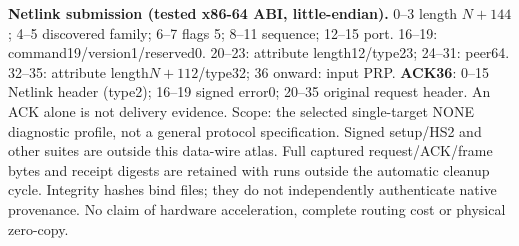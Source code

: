 \documentclass[10pt,a4paper]{article}
\begin{document}
\textbf{Netlink submission (tested x86-64 ABI, little-endian).} 0--3 length $N+144$; 4--5 discovered family; 6--7 flags 5; 8--11 sequence; 12--15 port. 16--19: command19/version1/reserved0. 20--23: attribute length12/type23; 24--31: peer64. 32--35: attribute length$N+112$/type32; 36 onward: input PRP. \textbf{ACK36}: 0--15 Netlink header (type2); 16--19 signed error0; 20--35 original request header. An ACK alone is not delivery evidence.
\vfill
\footnotesize\color{muted}Scope: the selected single-target NONE diagnostic profile, not a general protocol specification. Signed setup/HS2 and other suites are outside this data-wire atlas. Full captured request/ACK/frame bytes and receipt digests are retained with runs outside the automatic cleanup cycle. Integrity hashes bind files; they do not independently authenticate native provenance. No claim of hardware acceleration, complete routing cost or physical zero-copy.
\end{document}
